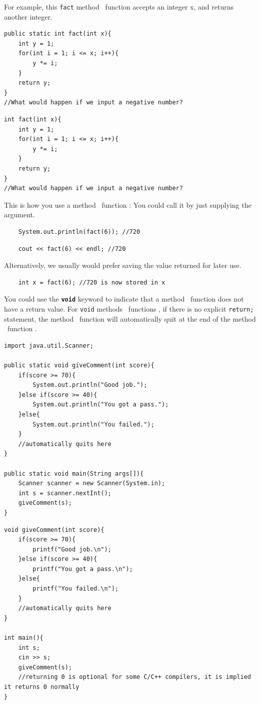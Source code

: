For example, this \texttt{fact}\if{} method \else ~function \fi accepts an integer x, and returns another integer.
\if{}
\begin{lstlisting}
public static int fact(int x){
    int y = 1;
    for(int i = 1; i <= x; i++){
        y *= i;
    }
    return y;
}
//What would happen if we input a negative number?
\end{lstlisting}
\else
\begin{lstlisting}
int fact(int x){
    int y = 1;
    for(int i = 1; i <= x; i++){
        y *= i;
    }
    return y;
}
//What would happen if we input a negative number?
\end{lstlisting}
\fi

This is how you use a\if{} method \else ~function \fi: 
You could call it by just supplying the argument.

\if{}
\begin{lstlisting}
    System.out.println(fact(6)); //720
\end{lstlisting}
\else
\begin{lstlisting}
    cout << fact(6) << endl; //720
\end{lstlisting}
\fi

Alternatively, we usually would prefer saving the value returned for later use.

\begin{lstlisting}
    int x = fact(6); //720 is now stored in x
\end{lstlisting}

You could use the \texttt{\textbf{void}} keyword to indicate that a\if{} method \else ~function \fi does not have a return value. For \texttt{void}\if{} methods \else ~functions \fi, if there is no explicit \texttt{return;} statement, the\if{} method \else ~function \fi will automatically quit at the end of the\if{} method \else ~function \fi. 

\if{}
\begin{lstlisting}
import java.util.Scanner;

public static void giveComment(int score){
    if(score >= 70){
        System.out.println("Good job.");
    }else if(score >= 40){
        System.out.println("You got a pass.");
    }else{
        System.out.println("You failed.");
    }
    //automatically quits here
}

public static void main(String args[]){
    Scanner scanner = new Scanner(System.in);  
    int s = scanner.nextInt();
    giveComment(s);
}
\end{lstlisting}
\else
\begin{lstlisting}
void giveComment(int score){
    if(score >= 70){
        printf("Good job.\n");
    }else if(score >= 40){
        printf("You got a pass.\n");
    }else{
        printf("You failed.\n");
    }
    //automatically quits here
}

int main(){
    int s;
    cin >> s;
    giveComment(s);
    //returning 0 is optional for some C/C++ compilers, it is implied it returns 0 normally
}
\end{lstlisting}
\fi

